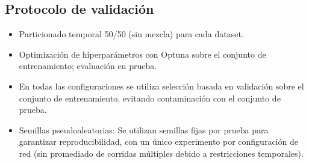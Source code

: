 



\subsection{Protocolo de validación}
\begin{itemize}
    \item Particionado temporal 50/50 (sin mezcla) para cada dataset.
    \item Optimización de hiperparámetros con Optuna sobre el conjunto de entrenamiento; evaluación en prueba. 
    \item En todas las configuraciones se utiliza selección basada en validación sobre el conjunto de entrenamiento, evitando contaminación con el conjunto de prueba.
    \item Semillas pseudoaleatorias: Se utilizan semillas fijas por prueba para garantizar reproducibilidad, con un único experimento por configuración de red (sin promediado de corridas múltiples debido a restricciones temporales).
\end{itemize}
